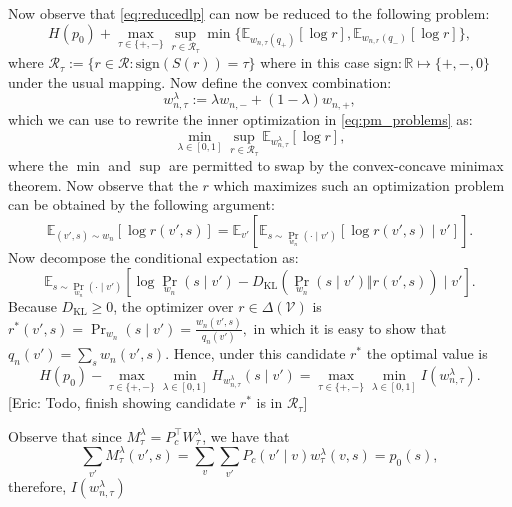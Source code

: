 \documentclass[12pt]{article}
\theoremstyle{plain}
\theoremstyle{definition}
\newcommand{\Eric}[1]{{\color{mint}[Eric: #1]}}
\begin{document}
Now observe that \eqref{eq:reducedlp} can now be reduced to the following problem:
\begin{equation}\label{eq:pm_problems}
    H(p_0) + \max_{\tau \in \{+,-\}}\sup_{r \in \mathcal{R}_{\tau}}\min \{ \mathbb{E}_{w_{n,\tau}(q_+)}[\log r], \mathbb{E}_{w_{n,r}(q_-)}[\log r]\},
\end{equation}
where $\mathcal{R}_{\tau} := \{r \in \mathcal{R}: \text{sign}(S(r)) = \tau\}$ where in this case $\text{sign}: \mathbb{R} \mapsto \{+,-, 0\}$ under the usual mapping. Now define the convex combination:
\[w_{n,\tau}^\lambda := \lambda w_{n,-} + (1-\lambda) w_{n,+},\]
which we can use to rewrite the inner optimization in \eqref{eq:pm_problems} as:
\[\min_{\lambda \in [0,1]}\sup_{r \in \mathcal{R}_{\tau}}\mathbb{E}_{w_{n,\tau}^\lambda}[\log r],\]
where the $\min$ and $\sup$ are permitted to swap by the convex-concave minimax theorem. Now observe that the $r$ which maximizes such an optimization problem can be obtained by the following argument:
\[\mathbb{E}_{(v',s) \sim w_n}[\log r(v',s)] = \mathbb{E}_{v'} [\mathbb{E}_{s \sim \Pr_{w_n}(\cdot 
\mid v')}[\log r(v',s)\mid v']].\]
Now decompose the conditional expectation as:
\[\mathbb{E}_{s \sim \Pr_{w_n}(\cdot\mid v')}[\log \Pr_{w_n}( s\mid v') - D_{\text{KL}}(\Pr_{w_n}(s\mid v') \Vert r(v',s) ) \mid v'].\] 
Because $D_{\text{KL}} \ge 0$, the optimizer over $r \in \Delta(\mathcal{V})$ is $r^*(v',s) = \Pr_{w_n}(s\mid v') = \frac{w_n(v',s)}{q_n(v')},$ in which it is easy to show that $q_n(v') = \sum_{s}w_n(v',s)$. Hence, under this candidate $r^*$ the optimal value is 
\[H(p_0) - \max_{\tau \in \{+,-\}}\min_{\lambda \in [0,1]}H_{w_{n,\tau}^\lambda}(s \mid v') =  \max_{\tau \in \{+,-\}}\min_{\lambda \in [0,1]}I(w_{n,\tau}^\lambda).\]
\Eric{Todo, finish showing candidate $r^*$ is in $\mathcal{R}_{\tau}$}

Observe that since $M_\tau^\lambda = P_c^\top W_\tau^\lambda$, we have that 
\[\sum_{v'}M_\tau^\lambda(v',s) = \sum_v\sum_{v'}P_c(v'\mid v)w_\tau^\lambda(v,s) = p_0(s),\]
therefore, $I(w_{n,\tau}^\lambda)$ 
\end{document}
